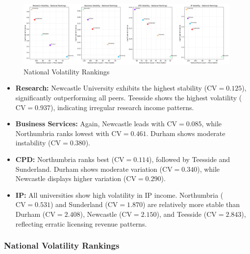 \documentclass[journal,onecolumn, 10pt,draftclsnofoot]{IEEEtran}
\begin{document}
\begin{figure}[h]
\centering
\includegraphics[width=0.99\textwidth]{Fig/figure42.national_volatility_rankings.png}
\caption{National Volatility Rankings}
\label{fig:national-volatility-rankings}
\end{figure}

\begin{itemize}
    \item \textbf{Research:} Newcastle University exhibits the highest stability ($\mathrm{CV}=0.125$), significantly outperforming all peers. Teesside shows the highest volatility ($\mathrm{CV}=0.937$), indicating irregular research income patterns.
    
    \item \textbf{Business Services:} Again, Newcastle leads with $\mathrm{CV}=0.085$, while Northumbria ranks lowest with $\mathrm{CV}=0.461$. Durham shows moderate instability ($\mathrm{CV}=0.380$).
    
    \item \textbf{CPD:} Northumbria ranks best ($\mathrm{CV}=0.114$), followed by Teesside and Sunderland. Durham shows moderate variation ($\mathrm{CV}=0.340$), while Newcastle displays higher variation ($\mathrm{CV}=0.290$).
    
    \item \textbf{IP:} All universities show high volatility in IP income. Northumbria ($\mathrm{CV}=0.531$) and Sunderland ($\mathrm{CV}=1.870$) are relatively more stable than Durham ($\mathrm{CV}=2.408$), Newcastle ($\mathrm{CV}=2.150$), and Teesside ($\mathrm{CV}=2.843$), reflecting erratic licensing revenue patterns.
\end{itemize}

\subsubsection{National Volatility Rankings}
\end{document}
